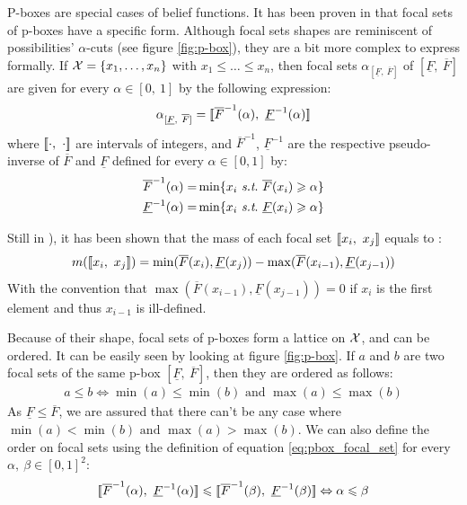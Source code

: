 \begin{definition}
    P-boxes are special cases of belief functions. It has been proven in \cite{destercke_unifying_2008} that focal sets of p-boxes have a specific form. Although focal sets shapes are reminiscent of possibilities' $\alpha$-cuts (see figure \ref{fig:p-box}), they are a bit more complex to express formally. If ${\mathcal{X}}=\{x_1, \dots, x_n\}$ with $x_1\leqslant\dots\leqslant x_n$, then focal sets $\alpha_{[\underline{F}, ~\overline{F}]}$ of $[\underline{F}, ~\overline{F}]$ are given for every $\alpha\in[0,~1]$ by the following expression:
    \begin{align}
        \alpha_{[\underline{F}, ~\overline{F}]}= {[\![} \overline{F}^{-1}(\alpha),~\underline{F}^{-1}(\alpha){]\!]}\label{eq:pbox_focal_set}
    \end{align}
    where ${[\![}\cdot,~\cdot{]\!]}$ are intervals of integers, and $\overline{F}^{-1}$, $\underline{F}^{-1}$ are the respective pseudo-inverse of $\overline{F}$ and $\underline{F}$ defined for every $\alpha\in[0,1]$ by:
    \begin{align*}
        \overline{F}^{-1}(\alpha) =& \min \{x_i ~\st ~\overline{F}(x_i)\geqslant \alpha\}\\
        \underline{F}^{-1}(\alpha) =& \min \{x_i ~\st ~\underline{F}(x_i)\geqslant \alpha\}
    \end{align*}
    
    Still in \cite{destercke_unifying_2008}), it has been shown that the mass of each focal set ${[\![} x_i, ~x_j{]\!]}$ equals to :
    \begin{align}
        m({[\![} x_i, ~x_j{]\!]}) = \min(\overline{F}(x_i), \underline{F}(x_j)) - \max(\overline{F}(x_{i-1}), \underline{F}(x_{j-1}))
    \end{align}
    With the convention that $\max(\overline{F}(x_{i-1}), \underline{F}(x_{j-1}))=0$ if $x_{i}$ is the first element and thus $x_{i-1}$ is ill-defined. 
\end{definition}

Because of their shape, focal sets of p-boxes form a lattice on ${\mathcal{X}}$, and can be ordered. It can be easily seen by looking at figure \ref{fig:p-box}. If $a$ and $b$ are two focal sets of the same p-box $[\underline{F}, ~\overline{F}]$, then they are ordered as follows:
\begin{align}
    a\leqslant b \Leftrightarrow \min(a)\leqslant\min(b) \text{ and } \max(a)\leqslant \max(b)
\end{align}
As $\underline{F}\leqslant\overline{F}$, we are assured that there can't be any case where $\min(a)<\min(b) \text{ and } \max(a)> \max(b)$. We can also define the order on focal sets using the definition of equation \eqref{eq:pbox_focal_set} for every $\alpha,~\beta\in[0,1]^2$:
\begin{align*}
    {[\![}\overline{F}^{-1}(\alpha), ~\underline{F}^{-1}(\alpha){]\!]} \leqslant {[\![}\overline{F}^{-1}(\beta), ~\underline{F}^{-1}(\beta){]\!]} \Leftrightarrow \alpha\leqslant\beta
\end{align*}

